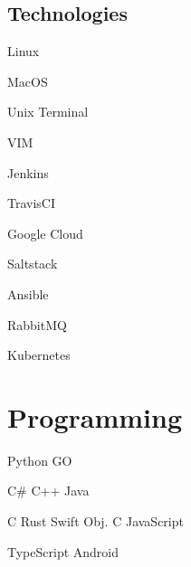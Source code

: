 \documentclass[]{cv}
\begin{document}
\begin{minipage}[t]{0.33\textwidth}
\subsection{Technologies}

\begin{tightemize}
	\item Linux
	\item MacOS
	\item Unix Terminal
	\item VIM
\end{tightemize}
\begin{tightemize}
	\item Jenkins
	\item TravisCI
	\item Google Cloud
	\item Saltstack
	\item Ansible
	\item RabbitMQ
	\item Kubernetes
\end{tightemize}
\sectionsep

\section{Programming}
Python \textbullet GO
\sectionsep	

C\# \textbullet C++ \textbullet Java
\sectionsep

C \textbullet Rust \textbullet Swift \textbullet Obj. C \textbullet JavaScript
\sectionsep

TypeScript \textbullet Android

\end{minipage} 
\hfill
\end{document}
